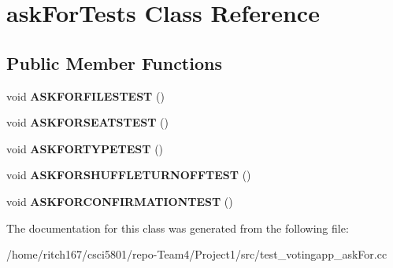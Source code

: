 \hypertarget{classaskForTests}{}\section{ask\+For\+Tests Class Reference}
\label{classaskForTests}
\subsection*{Public Member Functions}
\begin{DoxyCompactItemize}
\item 
\mbox{\label{classaskForTests_a5e44bca5c1632261b9f5e58f60094bac}} 
void {\bfseries A\+S\+K\+F\+O\+R\+F\+I\+L\+E\+S\+T\+E\+ST} ()
\item 
\mbox{\label{classaskForTests_a7f94e95ef180f23374591b42f0d92a7b}} 
void {\bfseries A\+S\+K\+F\+O\+R\+S\+E\+A\+T\+S\+T\+E\+ST} ()
\item 
\mbox{\label{classaskForTests_aefe0581990d8982150551a85b15927df}} 
void {\bfseries A\+S\+K\+F\+O\+R\+T\+Y\+P\+E\+T\+E\+ST} ()
\item 
\mbox{\label{classaskForTests_aabc91a9e604b3ab8a848cc5b88d105f0}} 
void {\bfseries A\+S\+K\+F\+O\+R\+S\+H\+U\+F\+F\+L\+E\+T\+U\+R\+N\+O\+F\+F\+T\+E\+ST} ()
\item 
\mbox{\label{classaskForTests_a7efc1dbfdcdf098e6bc2593599a81379}} 
void {\bfseries A\+S\+K\+F\+O\+R\+C\+O\+N\+F\+I\+R\+M\+A\+T\+I\+O\+N\+T\+E\+ST} ()
\end{DoxyCompactItemize}


The documentation for this class was generated from the following file\+:\begin{DoxyCompactItemize}
\item 
/home/ritch167/csci5801/repo-\/\+Team4/\+Project1/src/test\+\_\+votingapp\+\_\+ask\+For.\+cc\end{DoxyCompactItemize}
